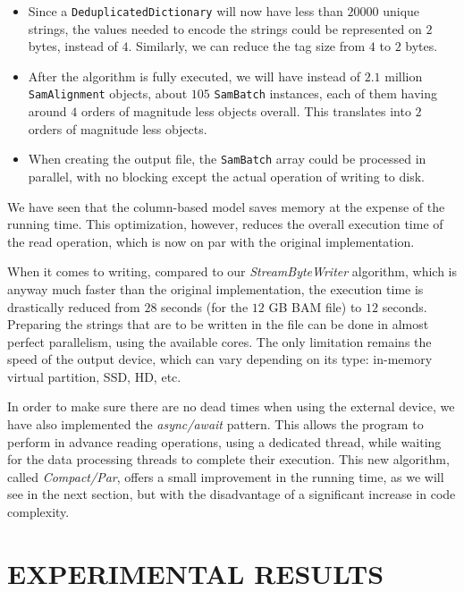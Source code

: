 \documentclass[a4paper,twoside]{article}
\begin{document}
{\begin{itemize}
\item Since a {\texttt{DeduplicatedDictionary}} will now have less than $20000$ unique strings, the values needed to encode the strings could be represented on $2$ bytes, instead of $4$.
Similarly, we can reduce the tag size from $4$ to $2$ bytes.

\item After the algorithm is fully executed,  we will have instead of $2.1$ million {\texttt{SamAlignment}} objects, about $105$ {\texttt{SamBatch}} instances, each of them having around $4$ orders of magnitude less objects overall.
This translates into $2$ orders of magnitude less objects.

\item When creating the output file, the {\texttt{SamBatch}} array could be processed in parallel, with no blocking except the actual operation of writing to disk.
\end{itemize}

We have seen that the column-based model saves memory at the expense of the running time.
This optimization, however, reduces the overall execution time of the read operation, which is now on par with the original implementation.

When it comes to writing, compared to our {\textit{StreamByteWriter} } algorithm, which is anyway much faster than the original implementation, the execution time is drastically reduced from $28$ seconds (for the $12$ GB BAM file) to $12$ seconds.
Preparing the strings that are to be written in the file can be done in almost perfect parallelism, using the available cores.
The only limitation remains the speed of the output device, which can vary depending on its type: in-memory virtual partition, SSD, HD, etc.

In order to make sure there are no dead times when using the external device, 
we have also implemented the {\textit{async/await}} pattern.
This allows the program to perform in advance reading operations, using a dedicated thread, while waiting for the data processing threads to complete their execution.
This new algorithm, called {\textit{Compact/Par}}, offers a small improvement in the running time, as we will see in the next section, but with the disadvantage of a significant increase in code complexity.

\section{\uppercase{Experimental Results}}
\label{sec:results}

}
\end{document}
